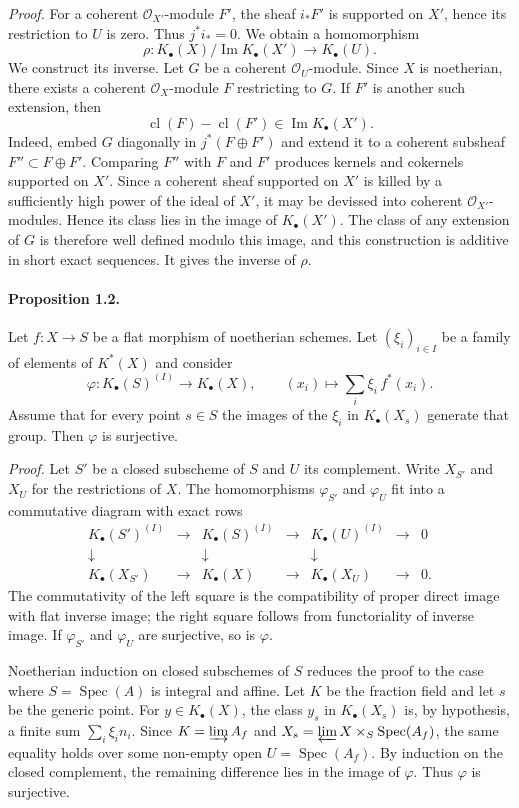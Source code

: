 \documentclass[12pt]{article}
\newcommand{\cO}{\mathcal O}
\newcommand{\Spec}{\operatorname{Spec}}
\newcommand{\Imop}{\operatorname{Im}}
\newcommand{\cl}{\operatorname{cl}}
\newcommand{\longto}{\longrightarrow}
\begin{document}
\emph{Proof.}
For a coherent $\cO_{X'}$-module $F'$, the sheaf $i_*F'$ is supported on $X'$, hence its restriction to $U$ is zero. Thus $j^*i_*=0$. We obtain a homomorphism
\[
\rho:K_\bullet(X)/\Imop K_\bullet(X')\longto K_\bullet(U).
\]
We construct its inverse. Let $G$ be a coherent $\cO_U$-module. Since $X$ is noetherian, there exists a coherent $\cO_X$-module $F$ restricting to $G$. If $F'$ is another such extension, then
\[
\cl(F)-\cl(F')\in\Imop K_\bullet(X').
\]
Indeed, embed $G$ diagonally in $j^*(F\oplus F')$ and extend it to a coherent subsheaf $F''\subset F\oplus F'$. Comparing $F''$ with $F$ and $F'$ produces kernels and cokernels supported on $X'$. Since a coherent sheaf supported on $X'$ is killed by a sufficiently high power of the ideal of $X'$, it may be devissed into coherent $\cO_{X'}$-modules. Hence its class lies in the image of $K_\bullet(X')$. The class of any extension of $G$ is therefore well defined modulo this image, and this construction is additive in short exact sequences. It gives the inverse of $\rho$.

\paragraph{Proposition 1.2.}
Let $f:X\to S$ be a flat morphism of noetherian schemes. Let $(\xi_i)_{i\in I}$ be a family of elements of $K^*(X)$ and consider
\[
\varphi:K_\bullet(S)^{(I)}\longto K_\bullet(X),\qquad
(x_i)\longmapsto \sum_i \xi_i\,f^*(x_i).
\]
Assume that for every point $s\in S$ the images of the $\xi_i$ in $K_\bullet(X_s)$ generate that group. Then $\varphi$ is surjective.

\emph{Proof.}
Let $S'$ be a closed subscheme of $S$ and $U$ its complement. Write $X_{S'}$ and $X_U$ for the restrictions of $X$. The homomorphisms $\varphi_{S'}$ and $\varphi_U$ fit into a commutative diagram with exact rows
\[
\begin{array}{ccccccccc}
K_\bullet(S')^{(I)}&\to&K_\bullet(S)^{(I)}&\to&K_\bullet(U)^{(I)}&\to&0\\
\downarrow&&\downarrow&&\downarrow&&\\
K_\bullet(X_{S'})&\to&K_\bullet(X)&\to&K_\bullet(X_U)&\to&0.
\end{array}
\]
The commutativity of the left square is the compatibility of proper direct image with flat inverse image; the right square follows from functoriality of inverse image. If $\varphi_{S'}$ and $\varphi_U$ are surjective, so is $\varphi$.

Noetherian induction on closed subschemes of $S$ reduces the proof to the case where $S=\Spec(A)$ is integral and affine. Let $K$ be the fraction field and let $s$ be the generic point. For $y\in K_\bullet(X)$, the class $y_s$ in $K_\bullet(X_s)$ is, by hypothesis, a finite sum $\sum_i \xi_i n_i$. Since $K=\varinjlim A_f$ and $X_s=\varprojlim X\times_S\Spec(A_f)$, the same equality holds over some non-empty open $U=\Spec(A_f)$. By induction on the closed complement, the remaining difference lies in the image of $\varphi$. Thus $\varphi$ is surjective.
\end{document}
